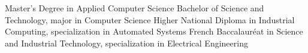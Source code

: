%
%
%


\begin{scholarship}
					{Master’s Degree in Applied Computer Science}
					{Bachelor of Science and Technology, major in Computer Science}
					{Higher National Diploma in Industrial Computing, specialization in Automated Systems}
					{French Baccalauréat in Science and Industrial Technology, specialization in Electrical Engineering}
\end{scholarship}
